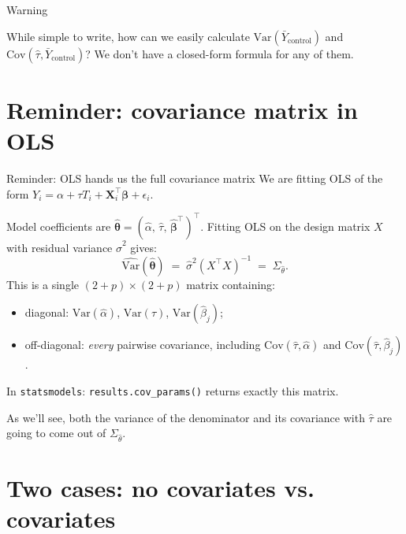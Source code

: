 \documentclass[10pt]{beamer}
\begin{document}
\begin{frame}{Warning}


While simple to write, how can we easily calculate $\mathrm{Var}(\bar Y_{\text{control}})$ and $\mathrm{Cov}(\hat\tau, \bar Y_{\text{control}})$? We don't have a closed-form formula for any of them.

\end{frame}

\section{Reminder: covariance matrix in OLS}

\begin{frame}{Reminder: OLS hands us the full covariance matrix}
We are fitting OLS of the form $Y_i = \alpha + \tau T_i + \mathbf{X}_i^\top \bm\beta + \epsilon_i$.

Model coefficients are $\hat{\bm\theta} = (\hat\alpha,\, \hat\tau,\, \hat{\bm\beta}^\top)^\top$. Fitting OLS on the design matrix $X$ with residual variance $\hat\sigma^2$ gives:
\[
\widehat{\mathrm{Var}}(\hat{\bm\theta}) \;=\; \hat\sigma^2 (X^\top X)^{-1} \;=\; \Sigma_{\hat\theta}.
\]
This is a single $(2+p)\times(2+p)$ matrix containing:
\begin{itemize}
  \item diagonal: $\mathrm{Var}(\hat\alpha)$, $\mathrm{Var}(\hat\tau)$, $\mathrm{Var}(\hat\beta_j)$;
  \item off-diagonal: \emph{every} pairwise covariance, including
  $\mathrm{Cov}(\hat\tau,\hat\alpha)$ and $\mathrm{Cov}(\hat\tau,\hat\beta_j)$.
\end{itemize}
In \texttt{statsmodels}: \texttt{results.cov\_params()} returns exactly this matrix.

\medskip
As we'll see, both the variance of the denominator and its covariance with $\hat\tau$ are going to come out of $\Sigma_{\hat\theta}$.
\end{frame}

\section{Two cases: no covariates vs. covariates}
\end{document}
